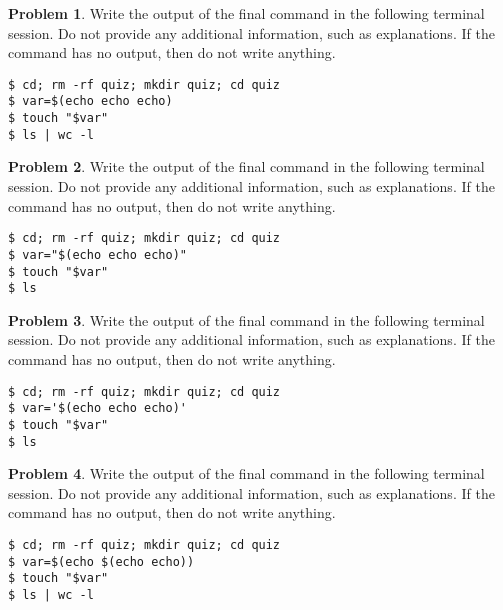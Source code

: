 \documentclass[10pt]{article}
\theoremstyle{definition}
\newtheorem{problem}{Problem}
\begin{document}
\begin{samepage}
\begin{problem}
Write the output of the final command in the following terminal session.
Do not provide any additional information,
such as explanations.
If the command has no output,
then do not write anything.

\end{problem}
\begin{lstlisting}
$ cd; rm -rf quiz; mkdir quiz; cd quiz
$ var=$(echo echo echo)
$ touch "$var"
$ ls | wc -l
\end{lstlisting}
\end{samepage}


\begin{samepage}
\begin{problem}
Write the output of the final command in the following terminal session.
Do not provide any additional information,
such as explanations.
If the command has no output,
then do not write anything.

\end{problem}
\begin{lstlisting}
$ cd; rm -rf quiz; mkdir quiz; cd quiz
$ var="$(echo echo echo)"
$ touch "$var"
$ ls
\end{lstlisting}
\end{samepage}


\begin{samepage}
\begin{problem}
Write the output of the final command in the following terminal session.
Do not provide any additional information,
such as explanations.
If the command has no output,
then do not write anything.

\end{problem}
\begin{lstlisting}
$ cd; rm -rf quiz; mkdir quiz; cd quiz
$ var='$(echo echo echo)'
$ touch "$var"
$ ls
\end{lstlisting}
\end{samepage}


\begin{samepage}
\begin{problem}
Write the output of the final command in the following terminal session.
Do not provide any additional information,
such as explanations.
If the command has no output,
then do not write anything.

\end{problem}
\begin{lstlisting}
$ cd; rm -rf quiz; mkdir quiz; cd quiz
$ var=$(echo $(echo echo))
$ touch "$var"
$ ls | wc -l
\end{lstlisting}
\end{samepage}
\end{document}
